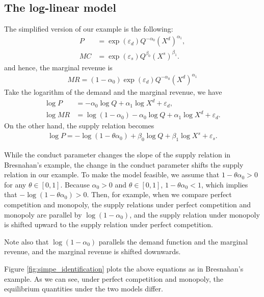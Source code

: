 \documentclass[11pt, a4paper]{article}
\theoremstyle{remark}
\begin{document}
\subsection{The log-linear model}

The simplified version of our example is the following:
\begin{align}
    P & = \exp(\varepsilon_{d}) Q^{-\alpha_0} (X^{d})^{\alpha_1},\label{eq:simple_demand} \\
    MC & = \exp(\varepsilon_{s}) Q^{\beta_0} (X^{s})^{\beta_1}. \label{eq:simple_marginal_cost}
\end{align}
and hence, the marginal revenue is
\begin{align}
    MR = (1- \alpha_0)\exp(\varepsilon_{d}) Q^{-\alpha_0} (X^{d})^{\alpha_1}
\end{align}
Take the logarithm of the demand and the marginal revenue, we have
\begin{align}
    \log P & = -\alpha_0 \log Q + \alpha_1 \log X^{d} + \varepsilon_d,\\
    \log MR& = \log (1 -\alpha_0) -\alpha_0 \log Q + \alpha_1 \log X^{d} + \varepsilon_d.
\end{align}
On the other hand, the supply relation becomes
\begin{align}
    \log P = -\log (1 - \theta \alpha_0) + \beta_0 \log Q + \beta_1 \log X^{s} + \varepsilon_s. \label{eq:simple_supply}
\end{align}

While the conduct parameter changes the slope of the supply relation in Bresnahan's example, the change in the conduct parameter shifts the supply relation in our example.
To make the model feasible, we assume that $1- \theta \alpha_0 >0$ for any $\theta \in [0,1]$.
Because $\alpha_0>0$ and $\theta \in [0,1]$, $1- \theta\alpha_0 <1$, which implies that $- \log(1- \theta\alpha_0) > 0$.
Then, for example, when we compare perfect competition and monopoly,  the supply relations under perfect competition and monopoly are parallel by $\log(1 - \alpha_0)$, and the supply relation under monopoly is shifted upward to the supply relation under perfect competition.

Note also that $\log (1 - \alpha_0)$ parallels the demand function and the marginal revenue, and the marginal revenue is shifted downwards.

Figure \ref{fig:simpe_identification} plots the above equations as in Bresnahan's example.
As we can see, under perfect competition and monopoly, the equilibrium quantities under the two models differ.
\end{document}
